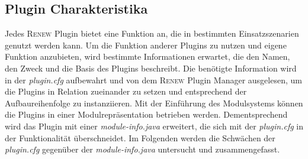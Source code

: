 	\subsection{Plugin Charakteristika} \label{sub:plugin_beschriftung}
		Jedes \textsc{Renew} Plugin bietet eine Funktion an, die in bestimmten Einsatzszenarien genutzt werden kann. Um die Funktion anderer Plugins zu nutzen und eigene Funktion anzubieten, wird bestimmte Informationen erwartet, die den Namen, den Zweck und die Basis des Plugins beschreibt. Die benötigte Information wird in der \textit{plugin.cfg} aufbewahrt und von dem \textsc{Renew} Plugin Manager ausgelesen, um die Plugins in Relation zueinander zu setzen und entsprechend der Aufbaureihenfolge zu instanziieren. \newline	
		Mit der Einführung des Modulsystems können die Plugins in einer Modulrepräsentation betrieben werden. Dementsprechend wird das Plugin mit einer \textit{module-info.java} erweitert, die sich mit der \textit{plugin.cfg} in der Funktionalität überschneidet. Im Folgenden werden die Schwächen der \textit{plugin.cfg} gegenüber der \textit{module-info.java} untersucht und zusammengefasst. 

